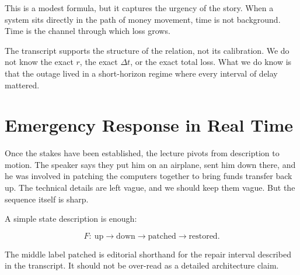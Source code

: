 This is a modest formula, but it captures the urgency of the story. When a system sits directly in the path of money movement, time is not background. Time is the channel through which loss grows.

\begin{remark}
The transcript supports the structure of the relation, not its calibration. We do not know the exact \(r\), the exact \(\Delta t\), or the exact total loss. What we do know is that the outage lived in a short-horizon regime where every interval of delay mattered.
\end{remark}

\section{Emergency Response in Real Time}

Once the stakes have been established, the lecture pivots from description to motion. The speaker says they put him on an airplane, sent him down there, and he was involved in patching the computers together to bring funds transfer back up. The technical details are left vague, and we should keep them vague. But the sequence itself is sharp.

A simple state description is enough:

\begin{equation}
F:\ \text{up} \rightarrow \text{down} \rightarrow \text{patched} \rightarrow \text{restored}.
\end{equation}

The middle label \(\text{patched}\) is editorial shorthand for the repair interval described in the transcript. It should not be over-read as a detailed architecture claim.

\begin{figure}[h]
\centering
{}
\end{figure}


